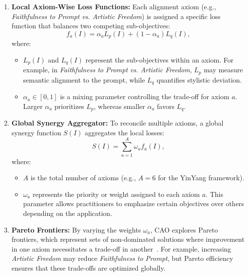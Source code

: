 \begin{enumerate}
    \item \textbf{Local Axiom-Wise Loss Functions:}  
    Each alignment axiom (e.g., \textit{Faithfulness to Prompt vs. Artistic Freedom}) is assigned a specific loss function that balances two competing sub-objectives:
    \[
    f_a(I) = \alpha_a L_p(I) + (1 - \alpha_a)L_q(I),
    \]
    where:
    \begin{itemize}
        \item $L_p(I)$ and $L_q(I)$ represent the sub-objectives within an axiom. For example, in \textit{Faithfulness to Prompt vs. Artistic Freedom}, $L_p$ may measure semantic alignment to the prompt, while $L_q$ quantifies stylistic deviation.
        \item $\alpha_a \in [0, 1]$ is a mixing parameter controlling the trade-off for axiom $a$. Larger $\alpha_a$ prioritizes $L_p$, whereas smaller $\alpha_a$ favors $L_q$.
    \end{itemize}

    \item \textbf{Global Synergy Aggregator:}  
    To reconcile multiple axioms, a global synergy function $S(I)$ aggregates the local losses:
    \[
    S(I) = \sum_{a=1}^A \omega_a f_a(I),
    \]
    where:
    \begin{itemize}
        \item $A$ is the total number of axioms (e.g., $A=6$ for the YinYang framework).  
        \item $\omega_a$ represents the priority or weight assigned to each axiom $a$. This parameter allows practitioners to emphasize certain objectives over others depending on the application.
    \end{itemize}

    \item \textbf{Pareto Frontiers:}  
    By varying the weights $\omega_a$, CAO explores Pareto frontiers, which represent sets of non-dominated solutions where improvement in one axiom necessitates a trade-off in another~\cite{deb2001multi}. For example, increasing \textit{Artistic Freedom} may reduce \textit{Faithfulness to Prompt}, but Pareto efficiency ensures that these trade-offs are optimized globally.
\end{enumerate}

